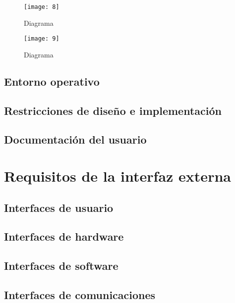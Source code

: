 \documentclass{scrreprt}
\begin{document}
		\begin{figure}[htbp]
			\begin{center}
				\texttt{[image: 8]}
				\caption{Diagrama}
				\label{referencia}
			\end{center}
		\end{figure}

		\begin{figure}[htbp]
			\begin{center}
				\texttt{[image: 9]}
				\caption{Diagrama}
				\label{referencia}
			\end{center}
		\end{figure}

		\section{Entorno operativo}

	
		\section{Restricciones de diseño e implementación}

	
		\section{Documentación del usuario}
	
	\chapter{Requisitos de la interfaz externa}
	
		\section{Interfaces de usuario}
		
		\section{Interfaces de hardware}
		
		\section{Interfaces de software}
		
		\section{Interfaces de comunicaciones}
\end{document}
